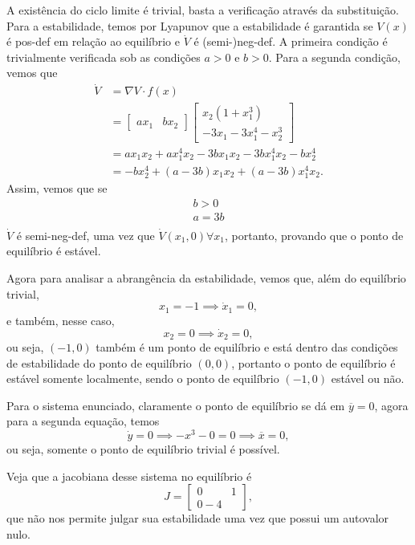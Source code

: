 \documentclass[a4paper]{report}
\begin{document}
A existência do ciclo limite é trivial, basta a verificação através da substituição. Para a estabilidade, temos por Lyapunov que a estabilidade é garantida se $V(x)$ é pos-def em relação ao equilíbrio e $\dot{V}$ é (semi-)neg-def. A primeira condição é trivialmente verificada sob as condições $a>0$ e $b>0$. Para a segunda condição, vemos que
\begin{align*}
    \dot{V} &= \nabla V \cdot f(x) \\
	    &= \begin{bmatrix} ax_1 & bx_2 \end{bmatrix} \begin{bmatrix} x_2\left( 1+x_1^3 \right) \\ -3x_1 -3x_1^{4} -x_2^3 \end{bmatrix} \\
	    &= ax_1x_2 + ax_1^{4}x_2 -3bx_1x_2 -3bx_1^{4}x_2 -bx_2^{4} \\
	    &= -bx_2^{4} +\left( a-3b \right) x_1x_2 +\left( a-3b \right) x_1^{4}x_2
.\end{align*}
Assim, vemos que se
\begin{align*}
    b>0 \\
    a=3b \\
\end{align*}
$\dot{V}$ é semi-neg-def, uma vez que $\dot{V}\left( x_1,0 \right) \forall x_1$, portanto, provando que o ponto de equilíbrio é estável.

Agora para analisar a abrangência da estabilidade, vemos que, além do equilíbrio trivial, \[
x_1 = -1 \implies \dot{x}_1 = 0
,\] e também, nesse caso, \[
x_2 = 0 \implies \dot{x}_2 = 0
,\] ou seja, $\left( -1,0 \right) $ também é um ponto de equilíbrio e está dentro das condições de estabilidade do ponto de equilíbrio $\left( 0,0 \right) $, portanto o ponto de equilíbrio é estável somente localmente, sendo o ponto de equilíbrio $\left( -1,0 \right) $ estável ou não.



Para o sistema enunciado, claramente o ponto de equilíbrio se dá em $\overline{y}=0$, agora para a segunda equação, temos \[
    \dot{y} = 0 \implies -x^3 -0 = 0 \implies \overline{x} = 0
,\] ou seja, somente o ponto de equilíbrio trivial é possível.

Veja que a jacobiana desse sistema no equilíbrio é \[
    J = \begin{bmatrix} 0 & 1 \\ 0 -4 \end{bmatrix} 
,\] que não nos permite julgar sua estabilidade uma vez que possui um autovalor nulo.
\end{document}
